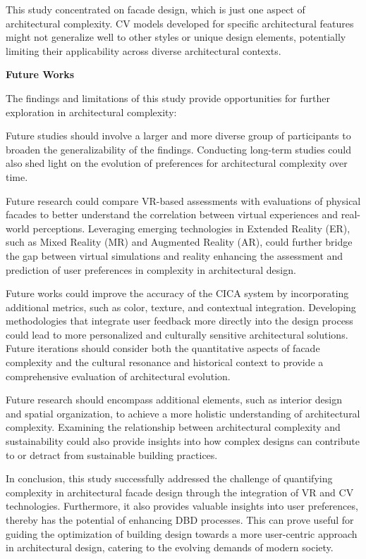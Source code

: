 This study concentrated on facade design, which is just one aspect of architectural complexity.
CV models developed for specific architectural features might not generalize well to other styles or unique design elements, potentially limiting their applicability across diverse architectural contexts.


\textbf{Future Works}

The findings and limitations of this study provide opportunities for further exploration in architectural complexity:

Future studies should involve a larger and more diverse group of participants to broaden the generalizability of the findings.
Conducting long-term studies could also shed light on the evolution of preferences for architectural complexity over time.

Future research could compare VR-based assessments with evaluations of physical facades to better understand the correlation between virtual experiences and real-world perceptions.
Leveraging emerging technologies in Extended Reality (ER), such as Mixed Reality (MR) and Augmented Reality (AR), could further bridge the gap between virtual simulations and reality enhancing the assessment and prediction of user preferences in complexity in architectural design.

Future works could improve the accuracy of the CICA system by incorporating additional metrics, such as color, texture, and contextual integration.
Developing methodologies that integrate user feedback more directly into the design process could lead to more personalized and culturally sensitive architectural solutions.
Future iterations should consider both the quantitative aspects of facade complexity and the cultural resonance and historical context to provide a comprehensive evaluation of architectural evolution.

Future research should encompass additional elements, such as interior design and spatial organization, to achieve a more holistic understanding of architectural complexity.
Examining the relationship between architectural complexity and sustainability could also provide insights into how complex designs can contribute to or detract from sustainable building practices.

In conclusion, this study successfully addressed the challenge of quantifying complexity in architectural facade design through the integration of VR and CV technologies.
Furthermore, it also provides valuable insights into user preferences, thereby has the potential of enhancing DBD processes.
This can prove useful for guiding the optimization of building design towards a more user-centric approach in architectural design, catering to the evolving demands of modern society.